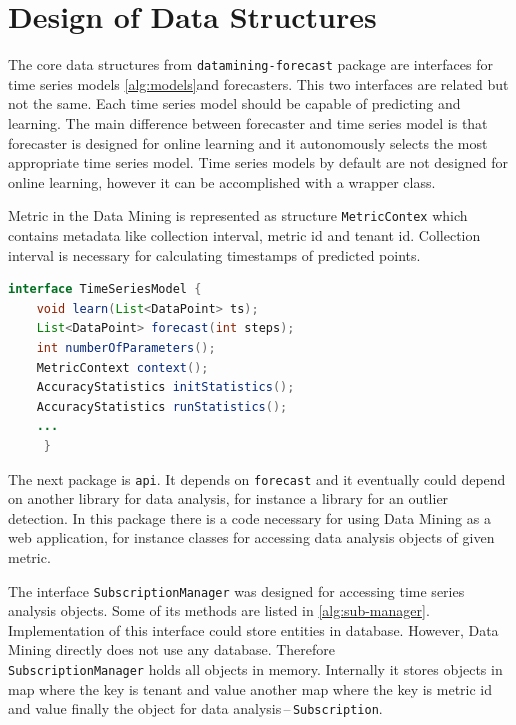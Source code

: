     \section{Design of Data Structures}
    The core data structures from \texttt{datamining-forecast} package are interfaces for time series models
    \ref{alg:models}and forecasters. This two interfaces are related but not the same. Each time series model should be capable of
    predicting and learning. The main difference between forecaster and time series model is that forecaster
    is designed for online learning and it autonomously selects the most appropriate time series model. Time series
    models by default are not designed for online learning, however it can be accomplished with a wrapper class.

    Metric in the Data Mining is represented as structure \texttt{MetricContex} which contains metadata like
    collection interval, metric id and tenant id. Collection interval is necessary for calculating timestamps of
    predicted points.

    \begin{lstlisting}[caption={Interface for time series models.}, language=Java, label={alg:models}]
interface TimeSeriesModel {
    void learn(List<DataPoint> ts);
    List<DataPoint> forecast(int steps);
    int numberOfParameters();
    MetricContext context();
    AccuracyStatistics initStatistics();
    AccuracyStatistics runStatistics();
    ...
     }
    \end{lstlisting}

    The next package is \texttt{api}. It depends on \texttt{forecast} and it eventually could
    depend on another library for data analysis, for instance a library for an outlier detection. In this package there
    is a code necessary for using Data Mining as a web application, for instance classes for accessing data analysis
    objects of given metric.

    The interface \texttt{SubscriptionManager} was designed for accessing time series analysis objects. Some of its
    methods are listed in \ref{alg:sub-manager}. Implementation of this interface could store entities in database.
    However, Data Mining directly does not use any database. Therefore \\ \texttt{SubscriptionManager} holds all objects
    in memory. Internally it stores objects in map where the key is tenant and value another map where the key is
    metric id and value finally the object for data analysis\,--\,\texttt{Subscription}.

